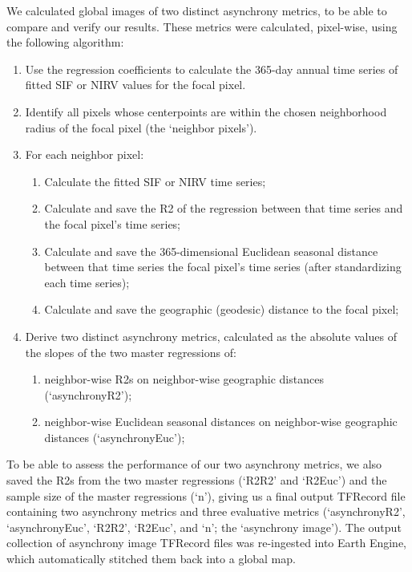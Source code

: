 \documentclass[9pt,twocolumn,twoside,lineno]{pnas-new}
\begin{document}
{We calculated global images of two distinct asynchrony metrics, to be
able to compare and verify our results. These metrics were calculated,
pixel-wise, using the following algorithm:
\begin{enumerate}
    \item Use the regression coefficients to calculate the 365-day annual time series of fitted SIF or NIRV values for the focal pixel.
    \item Identify all pixels whose centerpoints are within the chosen neighborhood radius of the focal pixel (the ‘neighbor pixels’).
    \item For each neighbor pixel:
    \begin{enumerate}
        \item Calculate the fitted SIF or NIRV time series;
        \item Calculate and save the R2 of the regression between that time series and the focal pixel’s time series;
        \item Calculate and save the 365-dimensional Euclidean seasonal distance between that time series the focal pixel’s time series (after standardizing each time series);
        \item Calculate and save the geographic (geodesic) distance to the focal pixel;
    \end{enumerate}
    \item Derive two distinct asynchrony metrics, calculated as the absolute values of the slopes of the two master regressions of:
        \begin{enumerate}
            \item neighbor-wise R2s on neighbor-wise geographic distances (‘asynchronyR2’);
            \item neighbor-wise Euclidean seasonal distances on neighbor-wise geographic distances (‘asynchronyEuc’);
        \end{enumerate}
\end{enumerate}

To be able to assess the performance of our two asynchrony metrics, we
also saved the R2s from the two master regressions (‘R2R2’ and ‘R2Euc’)
and the sample size of the master regressions (‘n’), giving us a final
output TFRecord file containing two asynchrony metrics and three
evaluative metrics (‘asynchronyR2’, ‘asynchronyEuc’, ‘R2R2’, ‘R2Euc’, and
‘n’; the ‘asynchrony image’). The output collection of asynchrony image
TFRecord files was re-ingested into Earth Engine, which automatically
stitched them back into a global map. 

}
\end{document}
